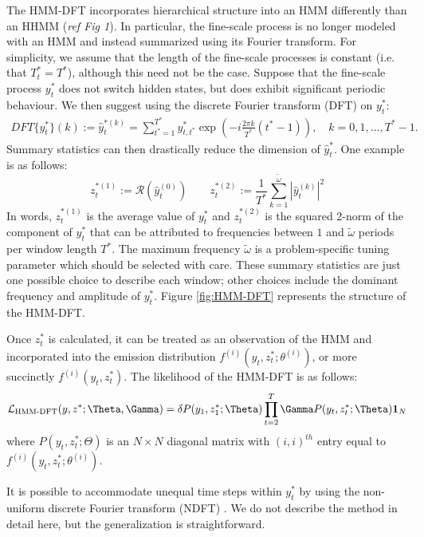 The HMM-DFT incorporates hierarchical structure into an HMM differently than an HHMM (\textit{ref Fig 1}). In particular, the fine-scale process is no longer modeled with an HMM and instead summarized using its Fourier transform. For simplicity, we assume that the length of the fine-scale processes is constant (i.e. that $T^*_t = T^*$), although this need not be the case. Suppose that the fine-scale process $y^*_t$ does not switch hidden states, but does exhibit significant periodic behaviour. We then suggest using the discrete Fourier transform (DFT) on $y^*_t$:
%
\begin{align*}
    DFT\{y^*_t\}(k) := \hat{y}^{*(k)}_{t} = \sum_{t^* = 1}^{T^*} y^*_{t,t^*}\exp\left(-i \frac{2\pi k}{T^*} (t^*-1)\right), \quad k = 0, 1, \ldots, T^*-1.
\end{align*}
%
Summary statistics can then drastically reduce the dimension of $\hat{y}^*_t$. One example is as follows:
%
\begin{equation}
    \label{eqn:z}
    z_t^{*(1)} := \mathcal{R}\left(\hat{y}^{(0)}_t\right) \qquad z_t^{*(2)} := \frac{1}{T^*}\sum_{k=1}^{\tilde{\omega}}|\hat{y}^{(k)}_t|^2
\end{equation}
%
In words, $z_t^{*(1)}$ is the average value of $y^*_t$ and $z_t^{*(2)}$ is the squared 2-norm of the component of $y^*_t$ that can be attributed to frequencies between $1$ and $\tilde{\omega}$ periods per window length $T^*$. The maximum frequency $\tilde{\omega}$ is a problem-specific tuning parameter which should be selected with care. These summary statistics are just one possible choice to describe each window; other choices include the dominant frequency and amplitude of $y^*_t$. Figure \ref{fig:HMM-DFT} represents the structure of the HMM-DFT.

Once $z^*_t$ is calculated, it can be treated as an observation of the HMM and incorporated into the emission distribution $f^{(i)}\left(y_t,z^*_t;\theta^{(i)}\right)$, or more succinctly $f^{(i)}\left(y_t,z^*_t\right)$. The likelihood of the HMM-DFT is as follows:
\begin{equation}
    \calL_{\text{HMM-DFT}}(y,z^*;\Theta,\Gamma) = \delta P(y_1,z^*_1;\Theta) \prod_{t=2}^T \Gamma P(y_t,z^*_t;\Theta) \mathbf{1}_N
    \label{HMMDFT_likelihood}
\end{equation}
where $P(y_t,z^*_t;\Theta)$ is an $N \times N$ diagonal matrix with $(i,i)^{th}$ entry equal to $f^{(i)}\left(y_t,z^*_t;\theta^{(i)}\right)$.

It is possible to accommodate unequal time steps within $y_t^*$ by using the non-uniform discrete Fourier transform (NDFT) \citep{Bagchi:1999}. We do not describe the method in detail here, but the generalization is straightforward.

